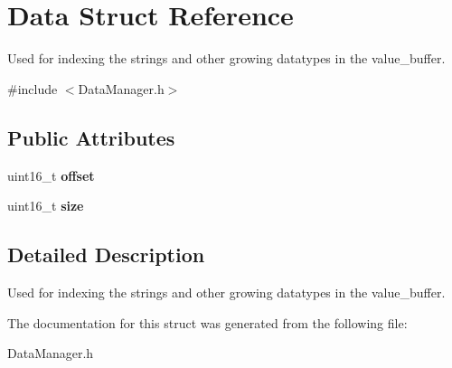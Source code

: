 \hypertarget{struct_data}{}\section{Data Struct Reference}
\label{struct_data}


Used for indexing the strings and other growing datatypes in the value\+\_\+buffer.  




{\ttfamily \#include $<$Data\+Manager.\+h$>$}

\subsection*{Public Attributes}
\begin{DoxyCompactItemize}
\item 
\mbox{\label{struct_data_afff59e4fe271677f730a7fb15112fdab}} 
uint16\+\_\+t {\bfseries offset}
\item 
\mbox{\label{struct_data_a5093b4a280ac574451618b432c89be30}} 
uint16\+\_\+t {\bfseries size}
\end{DoxyCompactItemize}


\subsection{Detailed Description}
Used for indexing the strings and other growing datatypes in the value\+\_\+buffer. 

The documentation for this struct was generated from the following file\+:\begin{DoxyCompactItemize}
\item 
Data\+Manager.\+h\end{DoxyCompactItemize}
